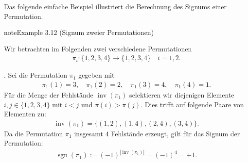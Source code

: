 \documentclass[letterpaper,10pt,english]{jupyterBook}
\begin{document}
\sphinxAtStartPar
Das folgende einfache Beispiel illustriert die Berechnung des Signums einer Permutation.
\label{vektoranalysis/tensor:example-27}
\begin{sphinxadmonition}{note}{Example 3.12 (Signum zweier Permutationen)}



\sphinxAtStartPar
Wir betrachten im Folgenden zwei verschiedene Permutationen
\begin{equation*}
\begin{split}\pi_i \colon \lbrace 1, 2, 3, 4 \rbrace \rightarrow \lbrace 1, 2, 3, 4 \rbrace \quad i=1,2.\end{split}
\end{equation*}


. Sei die Permutation \(\pi_1\) gegeben mit
\begin{equation*}
\begin{split}\pi_1(1) = 3, \quad \pi_1(2) = 2, \quad \pi_1(3) = 4, \quad \pi_1(4) = 1.\end{split}
\end{equation*}
\sphinxAtStartPar
Für die Menge der Fehlstände \(\operatorname{inv}(\pi_1)\) selektieren wir diejenigen Elemente \(i,j \in \lbrace 1,2,3,4 \rbrace\) mit \(i < j\) und \(\pi(i) > \pi(j)\).
Dies trifft auf folgende Paare von Elementen zu:
\begin{equation*}
\begin{split}\operatorname{inv}(\pi_1) = \lbrace (1,2), (1,4), (2,4), (3,4)\rbrace.\end{split}
\end{equation*}
\sphinxAtStartPar
Da die Permutation \(\pi_1\) insgesamt \(4\) Fehlstände erzeugt, gilt für das Signum der Permutation:
\begin{equation*}
\begin{split}\operatorname{sgn}(\pi_1) := (-1)^{|\operatorname{inv}(\pi_1)|} = (-1)^4 = +1.\end{split}
\end{equation*}



\end{sphinxadmonition}
\end{document}
